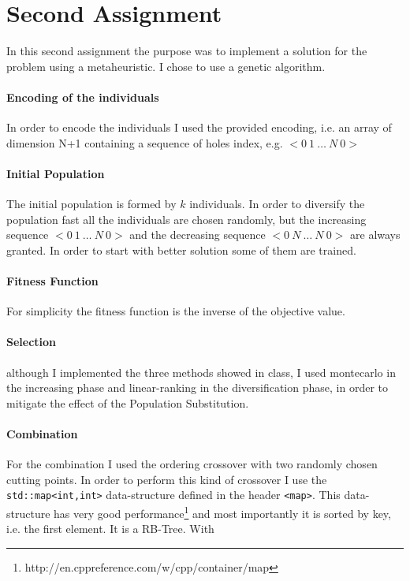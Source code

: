 \section{Second Assignment}
In this second assignment the purpose was to implement a solution for the problem
using a metaheuristic.
I chose to use a genetic algorithm. 
\paragraph{Encoding of the individuals} In order to encode the individuals I used the provided
encoding, i.e. an array of dimension N+1 containing a sequence of holes index, e.g.
$<0\ 1\ \dots\ N\ 0>$
\paragraph{Initial Population} The initial population is formed by $k$ individuals.
In order to diversify the population fast all the individuals are chosen randomly, but
the increasing sequence $<0\ 1\ \dots\ N\ 0>$ and the decreasing sequence $<0\ N\ \dots\ N\ 0>$
are always granted. In order to start with better solution some of them are trained.

\paragraph{Fitness Function} For simplicity the fitness function is the inverse of the
objective value.

\paragraph{Selection} although I implemented the three methods showed in class, I used montecarlo
in the increasing phase and linear-ranking in the diversification phase, in order to
mitigate the effect of the Population Substitution.

\paragraph{Combination} For the combination I used the ordering crossover with two randomly
chosen cutting points. In order to perform this kind of crossover I use the
\verb|std::map<int,int>| data-structure defined in the header \verb|<map>|. This data-structure
has very good performance\footnote{http://en.cppreference.com/w/cpp/container/map} and most importantly it is sorted by key, i.e. the first element. It is a RB-Tree.
With 


